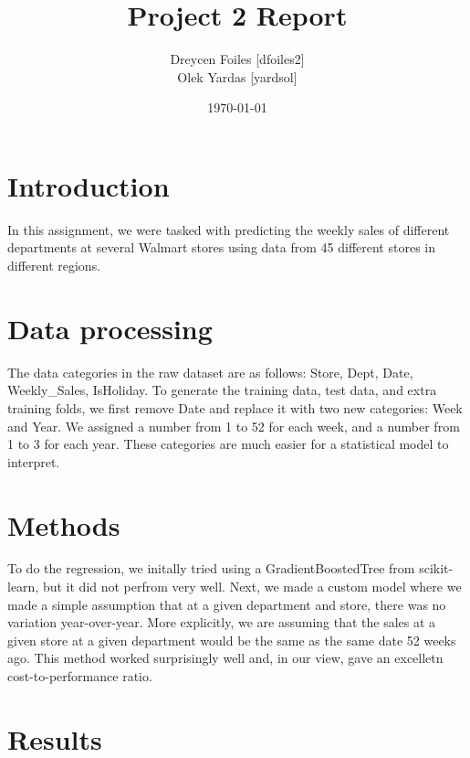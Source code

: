 \documentclass{article}
\title{Project 2 Report}
\author{Dreycen Foiles [dfoiles2] \\ Olek Yardas [yardsol]}
\date{\today}
\begin{document}
\maketitle

\section{Introduction}
In this assignment, we were tasked with predicting the weekly sales of
different departments at several Walmart stores using data from 45 different
stores in different regions.

\section{Data processing}
The data categories in the raw dataset are as follows: Store, Dept, Date,
Weekly\_Sales, IsHoliday. To generate the training data, test data, and extra
training folds, we first remove Date and replace it with two new categories:
Week and Year. We assigned a number from 1 to 52 for each week, and a number
from 1 to 3 for each year. These categories are much easier for a statistical model to interpret.

\section{Methods}
To do the regression, we initally tried using a GradientBoostedTree from
scikit-learn, but it did not perfrom very well. Next, we made a custom model
where we made a simple assumption that at a given department and store, there
was no variation year-over-year. More explicitly, we are assuming that the sales
at a given store at a given department would be the same as the same date 52
weeks ago. This method worked surprisingly well and, in our view, gave an excelletn cost-to-performance ratio.

\section{Results}
\end{document}
